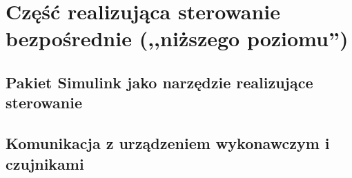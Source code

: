 \section{Część realizująca sterowanie bezpośrednie (,,niższego poziomu'')}
\label{sec:czesc-nizsza}


\subsection{Pakiet Simulink jako narzędzie realizujące sterowanie}
\label{sub:czesc-nizsza-matlab}

\cite{Trawinski2011}


\subsection{Komunikacja z urządzeniem wykonawczym i czujnikami}
\label{sub:czesc-nizsza-komunikacja}
